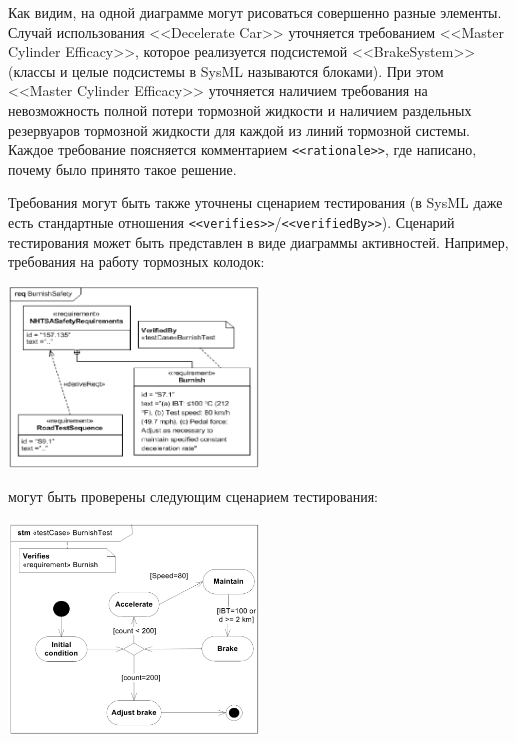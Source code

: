 \documentclass{../../text-style}
\begin{document}
Как видим, на одной диаграмме могут рисоваться совершенно разные элементы. Случай использования <<Decelerate Car>> уточняется требованием <<Master Cylinder Efficacy>>, которое реализуется подсистемой <<BrakeSystem>> (классы и целые подсистемы в SysML называются блоками). При этом <<Master Cylinder Efficacy>> уточняется наличием требования на невозможность полной потери тормозной жидкости и наличием раздельных резервуаров тормозной жидкости для каждой из линий тормозной системы. Каждое требование поясняется комментарием \verb|<<rationale>>|, где написано, почему было принято такое решение.

Требования могут быть также уточнены сценарием тестирования (в SysML даже есть стандартные отношения \verb|<<verifies>>|/\verb|<<verifiedBy>>|). Сценарий тестирования может быть представлен в виде диаграммы активностей. Например, требования на работу тормозных колодок:

\begin{center}
    \includegraphics[width=0.5\textwidth]{sysMlRequirementsTest.png}
\end{center}

могут быть проверены следующим сценарием тестирования:

\begin{center}
    \includegraphics[width=0.5\textwidth]{sysMlRequirementsTestActivity.png}
\end{center}
\end{document}
